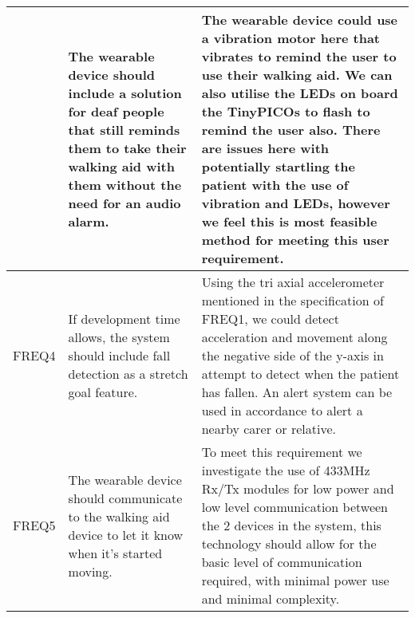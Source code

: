 \begin{xltabular}[H]{\textwidth}{c | X | X}
        &

        The wearable device should include a solution for deaf people that still reminds them to take their walking aid with them without the need for an audio alarm.

        &

        The wearable device could use a vibration motor here that vibrates to remind the user to use their walking aid. We can also utilise the LEDs on board the TinyPICOs to flash to remind the user also. There are issues here with potentially startling the patient with the use of vibration and LEDs, however we feel this is most feasible method for meeting this user requirement.\\

        \midrule

        FREQ4

        &

        If development time allows, the system should include fall detection as a stretch goal feature.

        &

        Using the tri axial accelerometer mentioned in the specification of FREQ1, we could detect acceleration and movement along the negative side of the y-axis in attempt to detect when the patient has fallen. An alert system can be used in accordance to alert a nearby carer or relative.\\

        \midrule

        FREQ5

        &

        The wearable device should communicate to the walking aid device to let it know when it's started moving.

        &

        To meet this requirement we investigate the use of 433MHz Rx/Tx modules for low power and low level communication between the 2 devices in the system, this technology should allow for the basic level of communication required, with minimal power use and minimal complexity.\\

	\end{xltabular}
	\label{tbl:func_reqs_table}
